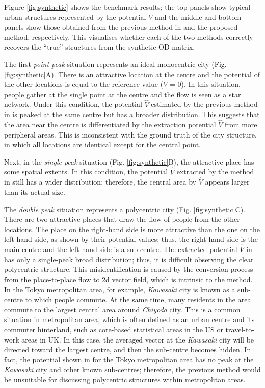 \documentclass[]{article}
\begin{document}
%

%
%
%
%
%
%
%
%

%
Figure \ref{fig:synthetic} shows the benchmark results;
the top panels show typical urban structures represented by the potential $V$
and the middle and bottom panels show those obtained from the previous method in \cite{Mazzoli2019b} and the proposed method, respectively.
This visualises whether each of the two methods correctly recovers the ``true'' structures from the synthetic OD matrix.
%

The first \textit{point peak} situation represents an ideal monocentric city (Fig. \ref{fig:synthetic}A).
There is an attractive location at the centre and the potential of the other locations is equal to the reference value ($V$ = 0).
In this situation, people gather at the single point at the centre and the flow is seen as a star network.
Under this condition, the potential $\hat{V}$ estimated by the previous method in \cite{Mazzoli2019b} is peaked at the same centre but has a broader distribution.
This suggests that the area near the centre is differentiated by the extraction potential $\hat{V}$ from more peripheral areas.
This is inconsistent with the ground truth of the city structure, in which all locations are identical except for the central point.

Next, in the \textit{single peak} situation (Fig. \ref{fig:synthetic}B), the attractive place has some spatial extents.
In this condition, the potential $\hat{V}$ extracted by the method in \cite{Mazzoli2019b}  still has a wider distribution; therefore, the central area by $\hat{V}$ appears larger than its actual size.

The \textit{double peak} situation represents a polycentric city (Fig. \ref{fig:synthetic}C).
There are two attractive places that draw the flow of people from the other locations.
The place on the right-hand side is more attractive than the one on the left-hand side, as shown by their potential values; thus, the right-hand side is the main centre and the left-hand side is a sub-centre.
The extracted potential $\hat{V}$ in \cite{Mazzoli2019b} has only a single-peak broad distribution;
thus, it is difficult observing the clear polycentric structure.
This misidentification is caused by the conversion process from the place-to-place flow to 2d vector field, which is intrinsic to the method.
In the Tokyo metropolitan area, for example, \textit{Kawasaki} city is known as a sub-centre \cite{Li2018} to which people commute. At the same time, many residents in the area commute to the largest central area around \textit{Chiyoda} city.
This is a common situation in metropolitan area, 
which is often defined as an urban centre and its commuter hinterland,
such as core-based statistical areas in the US or travel-to-work areas in UK.
In this case, the averaged vector at the \textit{Kawasaki} city will be directed toward the largest centre, and then the sub-centre becomes hidden.
In fact, the potential shown in \cite{Mazzoli2019b} for the Tokyo metropolitan area has no peak at the \textit{Kawasaki} city and other known sub-centres;
therefore, the previous method would be unsuitable for discussing polycentric structures within metropolitan areas.
%
 
\end{document}
